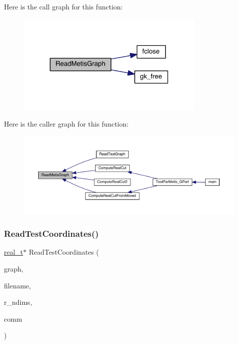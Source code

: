 Here is the call graph for this function\+:\nopagebreak
\begin{figure}[H]
\begin{center}
\leavevmode
\includegraphics[width=258pt]{a00861_a4ff02bbc05033b431cc3b60bc2f2a1a4_cgraph}
\end{center}
\end{figure}
Here is the caller graph for this function\+:\nopagebreak
\begin{figure}[H]
\begin{center}
\leavevmode
\includegraphics[width=350pt]{a00861_a4ff02bbc05033b431cc3b60bc2f2a1a4_icgraph}
\end{center}
\end{figure}
\mbox{\label{a00861_a4c1a88b3f492be37fe35e779692fb84c}} 
\subsubsection{\texorpdfstring{Read\+Test\+Coordinates()}{ReadTestCoordinates()}}
{\footnotesize\ttfamily \hyperlink{a00876_a1924a4f6907cc3833213aba1f07fcbe9}{real\+\_\+t}$\ast$ Read\+Test\+Coordinates (\begin{DoxyParamCaption}\item[{\hyperlink{a00734}{graph\+\_\+t} $\ast$}]{graph,  }\item[{char $\ast$}]{filename,  }\item[{\hyperlink{a00876_aaa5262be3e700770163401acb0150f52}{idx\+\_\+t} $\ast$}]{r\+\_\+ndims,  }\item[{M\+P\+I\+\_\+\+Comm}]{comm }\end{DoxyParamCaption})}

